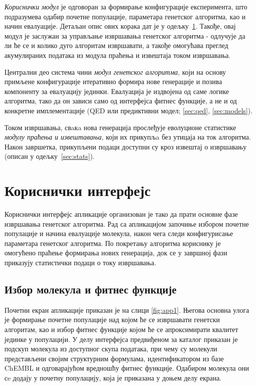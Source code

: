 \documentclass[12pt,oneside]{memoir}
\begin{document}
\textit{Кориснички модул} је одговоран за формирање
конфигурације експеримента, што подразумева одабир 
почетне популације, параметара генетског алгоритма, као и 
начин евалуације. Детаљан опис ових корака дат је у
одељку~\ref{chp:gui}. Такође, овај модул је заслужан за управљање 
извршавања генетског алгоритма - одлучује да ли ће се и колико дуго 
алгоритам извршавати, а такође омогућава преглед акумулираних 
података из модула праћења и извештаја током извршавања.


Централни део система чини \textit{модул генетског алгоритма}, који на основу
примљене конфигурације итеративно формира нове генерације и
позива компоненту за евалуацију јединки. Евалуација је издвојена
од саме логике алгоритма, тако да он зависи само од интерфејса
фитнес функције, а не и од конкретне имплементације (QED или
предиктивни модел; \ref{sec:qed}, \ref{sec:models}).

Током извршавања, свaкa нова генерација прослеђује еволуционе
статистике \textit{модулу праћења и извештавања}, који их прикупљa без
утицаја на ток алгоритма. Након завршетка, прикупљени подаци
доступни су кроз извештај о извршавању (описан у
одељку~\ref{sec:stats}).

\section{Кориснички интерфејс}
\label{chp:gui}

Кориснички интерфејс апликације организован је тако да прати основне фазе
извршавања генетског алгоритма. Рад са апликацијом започиње избором почетне
популације и начина евалуације молекула, након чега следи конфигурисање
параметара генетског алгоритма. По покретању алгоритма кориснику је омогућено
праћење формирања нових генерација, док се у завршној фази приказују
статистички подаци о току извршавања.

\subsection{Избор молекула и фитнес функције}

Почетни екран апликације приказан је на слици
\ref{fig:app1}. Његова основна улога је формирање почетне
популације над којом ће се извршавати генетски алгоритам, као и избор фитнес функције
којом ће се апроксимирати квалитет јединке у популацији. У делу интерфејса
предвиђеном за каталог приказан је подскуп молекула из доступног скупа
података, при чему су молекули представљени својим структурним формулама,
идентификатором из базе ChEMBL и одговарајућом вредношћу фитнес функције.
Одабиром молекула они сe додају у почетну популацију, која је приказана у
доњем делу екрана.
\end{document}
